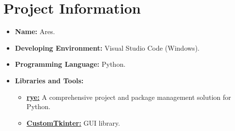 \section{Project Information}
\begin{itemize}
  \item \textbf{Name:} Ares.
  \item \textbf{Developing Environment:} Visual Studio Code (Windows).
  \item \textbf{Programming Language:} Python.
  \item \textbf{Libraries and Tools:}
        \begin{itemize}
          \item \href{https://rye.astral.sh/}{\textbf{rye:}} A comprehensive project and package management solution for Python.
          \item \href{https://customtkinter.tomschimansky.com/}{\textbf{CustomTkinter:}} GUI library.
        \end{itemize}
\end{itemize}
